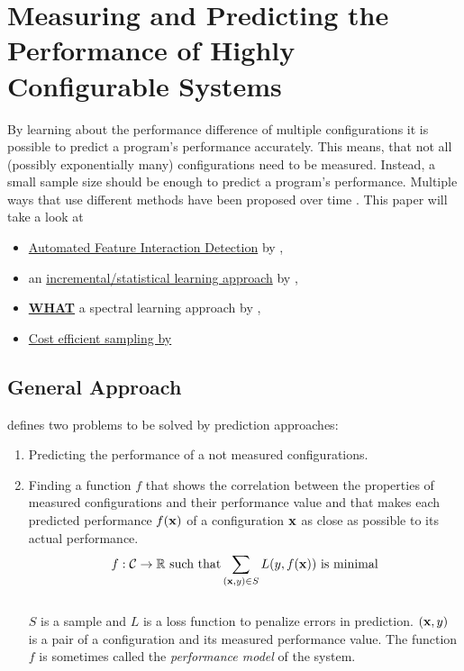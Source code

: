 \section{Measuring and Predicting the Performance of Highly Configurable Systems}\label{sec:measuring}

By learning about the performance difference of multiple configurations it is possible to predict a program's performance accurately. This means, that not all (possibly exponentially many) configurations need to be measured. Instead, a small sample size should be enough to predict a program's performance. Multiple ways that use different methods have been proposed over time \cite{FasterDiscoveryofFasterSystemConfigurationsSiegmund2017}. This paper will take a look at
\begin{itemize}
	\item \hyperref[sec:AFID]{Automated Feature Interaction Detection} by \citet{AutomatedFeatureDetectionSiegmund2012},
	\item an \hyperref[sec:VAPP]{incremental/statistical learning approach} by \citet{VariabilityAwarePerformancePredictionJianmeiSigmundApel},
	\item \hyperref[sec:WHAT]{\textbf{WHAT}} a spectral learning approach by \citet{FasterDiscoveryofFasterSystemConfigurationsSiegmund2017},
	\item \hyperref[sec:ProjectiveSampling]{Cost efficient sampling by \citet{CostEfficientSampling_Gou_Siegmund_2015}}
\end{itemize}

\subsection{General Approach}

\citet{VariabilityAwarePerformancePredictionJianmeiSigmundApel} defines two problems to be solved by prediction approaches:
\begin{enumerate}
	\item Predicting the performance of a not measured configurations.
	\item Finding a function $f$ that shows the correlation between the properties of measured configurations and their performance value and that makes each predicted performance $f(\mathrm{\mathbf{x}})$ of a configuration $\mathrm{\mathbf{x}}$ as close as possible to its actual performance.\\	
	\begin{equation}
	f : \mathcal{C} \rightarrow  \mathbb{R} \text{ such that} \sum_{(\mathrm{\mathbf{x}},y) \in S} L(y,f(\mathrm{\mathbf{x}})) \text{ is minimal}
	\end{equation}\\
	$S$ is a sample and	$L$ is a loss function to penalize errors in prediction. $(\mathrm{\mathbf{x}},y)$ is a pair of a configuration and its measured performance value. The function $f$ is sometimes called the \textit{performance model} of the system.
\end{enumerate}

